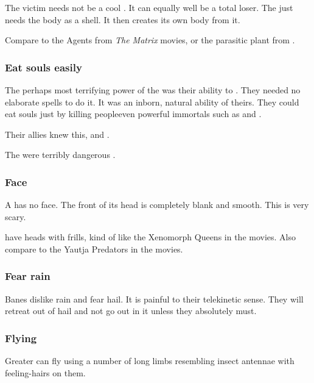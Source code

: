 The victim needs not be a cool \human. 
It can equally well be a total loser. 
The \bane{} just needs the body as a shell. 
It then creates its own \bane{} body from it. 

Compare to the Agents from \emph{The Matrix} movies, or the parasitic plant from . 





\subsubsection{Eat souls easily}
The perhaps most terrifying power of the \banes was their ability to . 
They needed no elaborate spells to do it. 
It was an inborn, natural ability of theirs. 
They could eat souls just by killing people\dash even powerful immortals such as \dragons and \resphain. 

Their \resphan allies knew this, and . 

The \banes{} were terribly dangerous . 





\subsubsection{Face}
A \bane{} has no face.
The front of its head is completely blank and smooth. 
This is very scary.

\Banelords{} have \armoured heads with frills, kind of like the Xenomorph Queens in the  movies. 
Also compare to the Yautja Predators in the  movies. 




\subsubsection{Fear rain}
Banes dislike rain and fear hail.
It is painful to their telekinetic sense.
They will retreat out of hail and not go out in it unless they absolutely must.






\subsubsection{Flying}
Greater \banes can fly using a number of long limbs resembling insect antennae with feeling-hairs on them.





